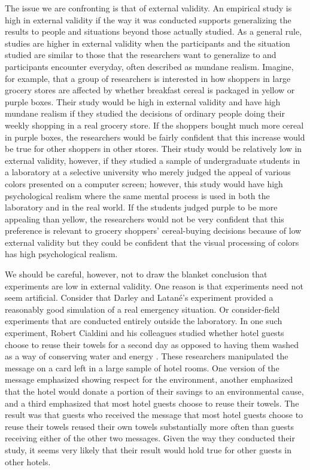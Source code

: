 The issue we are confronting is that of external validity. An empirical study is high in external validity if the way it was conducted supports generalizing the results to people and situations beyond those actually studied. As a general rule, studies are higher in external validity when the participants and the situation studied are similar to those that the researchers want to generalize to and participants encounter everyday, often described as mundane realism. Imagine, for example, that a group of researchers is interested in how shoppers in large grocery stores are affected by whether breakfast cereal is packaged in yellow or purple boxes. Their study would be high in external validity and have high mundane realism if they studied the decisions of ordinary people doing their weekly shopping in a real grocery store. If the shoppers bought much more cereal in purple boxes, the researchers would be fairly confident that this increase would be true for other shoppers in other stores. Their study would be relatively low in external validity, however, if they studied a sample of undergraduate students in a laboratory at a selective university who merely judged the appeal of various colors presented on a computer screen; however, this study would have high psychological realism where the same mental process is used in both the laboratory and in the real world. If the students judged purple to be more appealing than yellow, the researchers would not be very confident that this preference is relevant to grocery shoppers' cereal-buying decisions because of low external validity but they could be confident that the visual processing of colors has high psychological realism.

We should be careful, however, not to draw the blanket conclusion that experiments are low in external validity. One reason is that experiments need not seem artificial. Consider that Darley and Latan\'e's experiment provided a reasonably good simulation of a real emergency situation. Or consider-field experiments that are conducted entirely outside the laboratory. In one such experiment, Robert Cialdini and his colleagues studied whether hotel guests choose to reuse their towels for a second day as opposed to having them washed as a way of conserving water and energy \citep{cialdini_dont_2005}. These researchers manipulated the message on a card left in a large sample of hotel rooms. One version of the message emphasized showing respect for the environment, another emphasized that the hotel would donate a portion of their savings to an environmental cause, and a third emphasized that most hotel guests choose to reuse their towels. The result was that guests who received the message that most hotel guests choose to reuse their towels reused their own towels substantially more often than guests receiving either of the other two messages. Given the way they conducted their study, it seems very likely that their result would hold true for other guests in other hotels.

